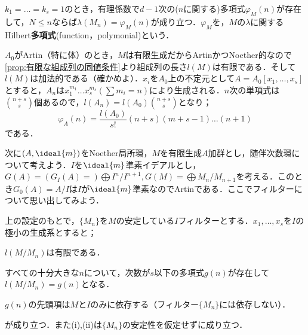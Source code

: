 \begin{defi}[Hilbert多項式]\label{defi:Hilbert多項式}
	$k_1=\dots=k_s=1$のとき，有理係数で$d-1$次の($n$に関する)多項式$\varphi_M(n)$が存在して，$N
	\leq n$ならば$\lambda(M_n)=\varphi_M(n)$が成り立つ．$\varphi_M$を，$M$の$\lambda$に関するHilbert\textbf{多項式}(function，polymonial)という．
\end{defi}

$A_0$がArtin（特に体）のとき，$M$は有限生成だからArtinかつNoether的なので\ref{prop:有限な組成列の同値条件}より組成列の長さ$l(M)$は有限である．そして$l(M)$は加法的である（確かめよ）．$x_i$を$A_0$上の不定元として$A=A_0[x_1,\dots,x_s]$とすると，$A_n$は$x_1^{m_1}\dots x_s^{m_s} (\sum m_i=n)$により生成される．$n$次の単項式は$\binom{n+s}{s}$個あるので，$l(A_n)=l(A_0)\binom{n+s}{s}$となり；
\[\varphi_A(n)=\frac{l(A_0)}{s!}(n+s)(m+s-1)\dots(n+1)\]
である．

次に$(A,\ideal{m})$をNoether局所環，$M$を有限生成$A$加群とし，随伴次数環について考えよう．$I$を$\ideal{m}$準素イデアルとし，$G(A)=(G_I(A)=)\bigoplus I^n/I^{n+1},G(M)=\bigoplus M_n/M_{n+1}$を考える．このとき$G_0(A)=A/I$は$I$が$\ideal{m}$準素なのでArtinである．ここでフィルターについて思い出してみよう．

\begin{prop}\label{prop:フィルターとHilbert多項式}
	上の設定のもとで，$\{M_n\}$を$M$の安定している$I$フィルターとする．$x_1,\dots,x_s$を$I$の極小の生成系とすると；
	\begin{sakura}
		\item $l(M/M_n)$は有限である．
		\item すべての十分大きな$n$について，次数が$s$以下の多項式$g(n)$が存在して$l(M/M_n)=g(n)$となる．
		\item $g(n)$の先頭項は$M$と$I$のみに依存する（フィルター$\{M_n\}$には依存しない）．
	\end{sakura}
	が成り立つ．また(i),(ii)は$\{M_n\}$の安定性を仮定せずに成り立つ．
\end{prop}

